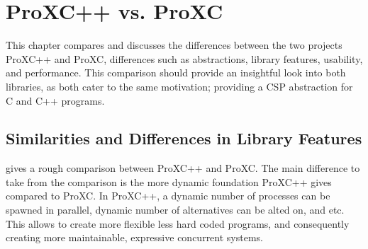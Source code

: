 


\chapter{ProXC++ vs. ProXC}

This chapter compares and discusses the differences between the two projects ProXC++ and ProXC, differences such as abstractions, library features, usability, and performance. This comparison should provide an insightful look into both libraries, as both cater to the same motivation; providing a CSP abstraction for C and C++ programs.

\section{Similarities and Differences in Library Features}

 gives a rough comparison between ProXC++ and ProXC. The main difference to take from the comparison is the more dynamic foundation ProXC++ gives compared to ProXC. In ProXC++, a dynamic number of processes can be spawned in parallel, dynamic number of alternatives can be alted on, and etc. This allows to create more flexible less hard coded programs, and consequently creating more maintainable, expressive concurrent systems.

